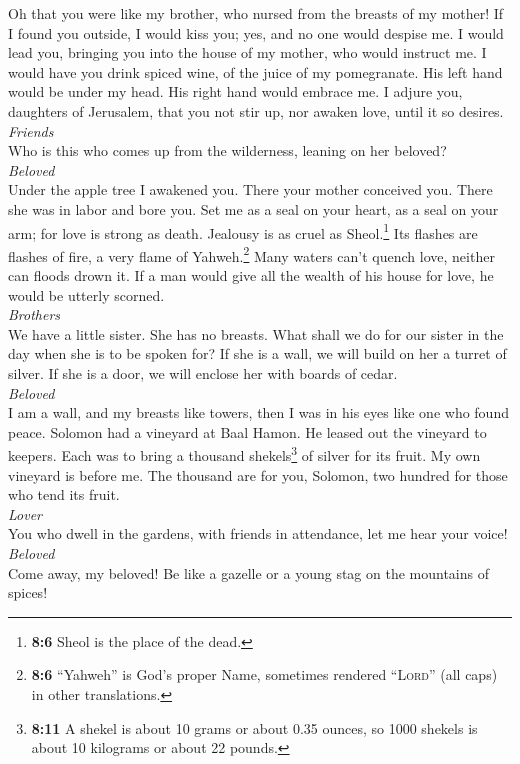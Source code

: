 Oh that you were like my brother, who nursed from the
breasts of my mother! If I found you outside, I would kiss you; yes, and
no one would despise me.  I would lead you, bringing you
into the house of my mother, who would instruct me. I would have you
drink spiced wine, of the juice of my pomegranate.  His
left hand would be under my head. His right hand would embrace me.
 I adjure you, daughters of Jerusalem, that you not stir
up, nor awaken love, until it so desires.\\
\emph{Friends}\\
 Who is this who comes up from the wilderness, leaning on
her beloved?\\
\emph{Beloved}\\
Under the apple tree I awakened you. There your mother conceived you.
There she was in labor and bore you.  Set me as a seal on
your heart, as a seal on your arm; for love is strong as death. Jealousy
is as cruel as Sheol.\footnote{\textbf{8:6} Sheol is the place of the
  dead.} Its flashes are flashes of fire, a very flame of
Yahweh.\footnote{\textbf{8:6} ``Yahweh'' is God's proper Name, sometimes
  rendered ``\textsc{Lord}'' (all caps) in other translations.}
 Many waters can't quench love, neither can floods drown
it. If a man would give all the wealth of his house for love, he would
be utterly scorned.\\
\emph{Brothers}\\
 We have a little sister. She has no breasts. What shall
we do for our sister in the day when she is to be spoken for?
 If she is a wall, we will build on her a turret of
silver. If she is a door, we will enclose her with boards of cedar.\\
\emph{Beloved}\\
 I am a wall, and my breasts like towers, then I was in
his eyes like one who found peace.  Solomon had a
vineyard at Baal Hamon. He leased out the vineyard to keepers. Each was
to bring a thousand shekels\footnote{\textbf{8:11} A shekel is about 10
  grams or about 0.35 ounces, so 1000 shekels is about 10 kilograms or
  about 22 pounds.} of silver for its fruit.  My own
vineyard is before me. The thousand are for you, Solomon, two hundred
for those who tend its fruit.\\
\emph{Lover}\\
 You who dwell in the gardens, with friends in
attendance, let me hear your voice!\\
\emph{Beloved}\\
 Come away, my beloved! Be like a gazelle or a young stag
on the mountains of spices!
